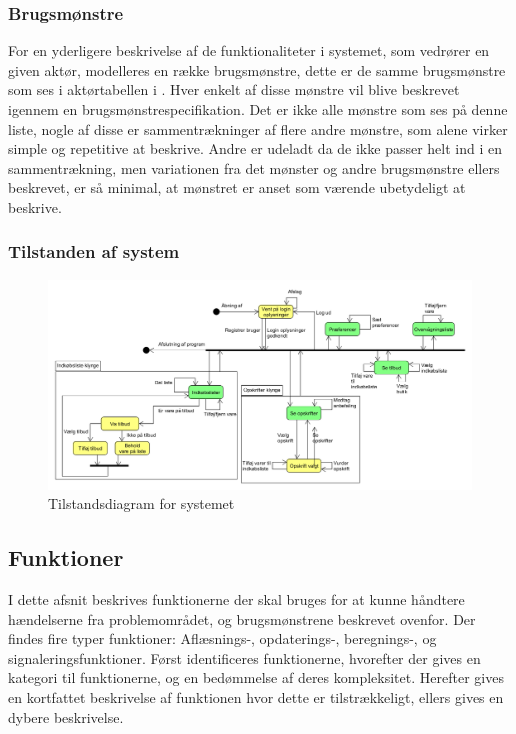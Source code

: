 \subsubsection*{Brugsmønstre}
For en yderligere beskrivelse af de funktionaliteter i systemet, som vedrører en given aktør, modelleres en række brugsmønstre, dette er de samme brugsmønstre som ses i aktørtabellen i .
Hver enkelt af disse mønstre vil blive beskrevet igennem en brugsmønstrespecifikation.
Det er ikke alle mønstre som ses på denne liste, nogle af disse er sammentrækninger af flere andre mønstre, som alene virker simple og repetitive at beskrive.
Andre er udeladt da de ikke passer helt ind i en sammentrækning, men variationen fra det mønster og andre brugsmønstre ellers beskrevet, er så minimal, at mønstret er anset som værende ubetydeligt at beskrive.



\subsubsection*{Tilstanden af system}
\begin{figure}
	\centering
	\includegraphics[scale=0.6, angle=90]{images/Diagrams/Tilstandsdiagram.PNG}
	\caption{Tilstandsdiagram for systemet}
	\label{tilstandsdiagram}
\end{figure}



\subsection{Funktioner}\label{subsec:funktioner}

I dette afsnit beskrives funktionerne der skal bruges for at kunne håndtere hændelserne fra problemområdet, og brugsmønstrene beskrevet ovenfor.
Der findes fire typer funktioner: Aflæsnings-, opdaterings-, beregnings-, og signaleringsfunktioner.\citep{OOA&D2001}
Først identificeres funktionerne, hvorefter der gives en kategori til funktionerne, og en bedømmelse af deres kompleksitet. Herefter gives en kortfattet beskrivelse af funktionen hvor dette er tilstrækkeligt, ellers gives en dybere beskrivelse.

